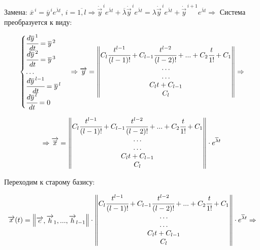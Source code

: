 Замена: $\overline{x}^{\,i} = \overline{y}^{\,i} e^{\overline{\lambda} t}$, $i = \overline{1, l} \Rightarrow \dot{\overrightarrow{y}}^{\,i} e^{\overline{\lambda} t} + \overline{\lambda} \dot{\overrightarrow{y}}^{\,i} e^{\overline{\lambda} t} = \lambda \dot{\overrightarrow{y}}^{\,i} e^{\overline{\lambda} t} + \dot{\overrightarrow{y}}^{\,i+1} e^{\overline{\lambda} t} \Rightarrow$
Система преобразуется к виду:

\begin{equation}
  \begin{cases}
    \cfrac{d\overline{y}^{\,1}}{dt} = \overline{y}^{\,2} \\ 
    \cfrac{d\overline{y}^{\,2}}{dt} = \overline{y}^{\,3} \\
    \ldots \\
    \cfrac{d\overline{y}^{\,l-1}}{dt} = \overline{y}^{\,l} \\
    \cfrac{d\overline{y}^{\,l}}{dt} = 0
  \end{cases}
  \Rightarrow 
  \overrightarrow{y} = \begin{Vmatrix*} C_l \cfrac{t^{l-1}}{(l-1)!} + C_{l-1} \cfrac{t^{l-2}}{(l-2)!} + ... + C_2 \cfrac{t}{1!} + C_1 \\
                            \ldots \\
                            \ldots \\
                            C_l t + C_{l-1} \\
                            C_l \end{Vmatrix*} \Rightarrow  
\end{equation}

\begin{equation*}
  \Rightarrow \overrightarrow{\overline{x}} = \begin{Vmatrix*} C_l \cfrac{t^{l-1}}{(l-1)!} + C_{l-1} \cfrac{t^{l-2}}{(l-2)!} + ... + C_2 \cfrac{t}{1!} + C_1 \\
    \ldots \\
    \ldots \\
    C_l t + C_{l-1} \\
    C_l \end{Vmatrix*} \cdot e^{\overline{\lambda} t} 
\end{equation*}


Переходим к старому базису: 

\[ \overrightarrow{x}(t) = \begin{Vmatrix*}
  \overrightarrow{e}, \overrightarrow{h}_1, ..., \overrightarrow{h}_{l-1} 
\end{Vmatrix*} \cdot \begin{Vmatrix*} C_l \cfrac{t^{l-1}}{(l-1)!} + C_{l-1} \cfrac{t^{l-2}}{(l-2)!} + ... + C_2 \cfrac{t}{1!} + C_1 \\
\ldots \\
\ldots \\
C_l t + C_{l-1} \\
C_l \end{Vmatrix*} \cdot e^{\overline{\lambda} t} \Rightarrow \] 

